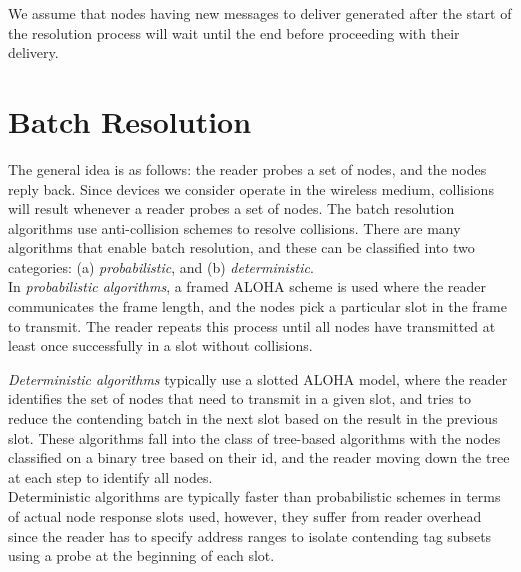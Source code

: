 \documentclass[12pt,a4paper,twocolumns]{report}
\begin{document}
We assume that nodes having new messages to deliver generated after the start of the resolution process will wait until the end before proceeding with their delivery.

\chapter{Batch Resolution}

The general idea is as follows: the reader probes a set of nodes, and the nodes reply back. 
Since devices we consider operate in the wireless medium, collisions will result whenever a reader probes a set of nodes. The batch resolution algorithms use anti-collision schemes to resolve collisions.
There are many algorithms that enable batch resolution, and these can be classified into two categories: (a) \emph{probabilistic}, and (b) \emph{deterministic}.\\

In \emph{probabilistic algorithms}, a framed ALOHA scheme is used where the reader communicates the frame length, and the nodes pick a particular slot in the frame to transmit. The reader repeats this process until all nodes have transmitted at least once successfully in a slot without collisions. 


\emph{Deterministic algorithms} typically use a slotted ALOHA model, where the reader identifies the set of nodes that need to transmit in a given slot, and tries to reduce the contending batch in the next slot based on the result in the previous slot. These algorithms fall into the class of tree-based algorithms with the nodes classified on a binary tree based on their id, and the reader moving down the tree at each step to identify all nodes. \\

Deterministic algorithms are typically faster than probabilistic schemes in terms of actual node response slots used, however, they suffer from reader overhead since the reader has to specify address ranges to isolate contending tag subsets using a probe at the beginning of each slot.
\end{document}
